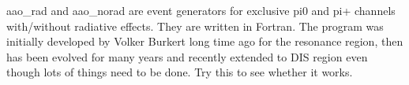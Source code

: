     aao\_rad and aao\_norad are event generators for exclusive pi0 and pi+ channels with/without radiative effects.  They are written in Fortran.  The program was initially developed by Volker Burkert long time ago for the resonance region, then has been evolved for many years and recently extended to DIS region even though lots of things need to be done.  Try this to see whether it works.  
\fi

   
